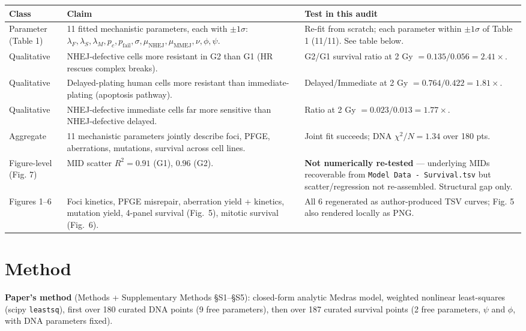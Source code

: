 \documentclass[11pt]{article}
\begin{document}
\begin{longtable}{p{3.5cm} p{6.5cm} p{5cm}}
\toprule
\textbf{Class} & \textbf{Claim} & \textbf{Test in this audit} \\
\midrule
\endhead
Parameter (Table 1) & 11 fitted mechanistic parameters, each with
$\pm 1\sigma$: $\lambda_F, \lambda_S, \lambda_M, p_c, p_{\text{fail}},
\sigma, \mu_{\text{NHEJ}}, \mu_{\text{MMEJ}}, \nu, \phi, \psi$. &
Re-fit from scratch; each parameter within $\pm 1\sigma$ of Table 1
(11/11). See table below. \\
Qualitative & NHEJ-defective cells more resistant in G2 than G1
(HR rescues complex breaks). &
G2/G1 survival ratio at 2 Gy $= 0.135 / 0.056 = 2.41\times$. \\
Qualitative & Delayed-plating human cells more resistant than
immediate-plating (apoptosis pathway). &
Delayed/Immediate at 2 Gy $= 0.764 / 0.422 = 1.81\times$. \\
Qualitative & NHEJ-defective immediate cells far more sensitive than
NHEJ-defective delayed. & Ratio at 2 Gy $= 0.023 / 0.013 = 1.77\times$. \\
Aggregate & 11 mechanistic parameters jointly describe foci, PFGE,
aberrations, mutations, survival across cell lines. &
Joint fit succeeds; DNA $\chi^2/N = 1.34$ over 180 pts. \\
Figure-level (Fig. 7) & MID scatter $R^2 = 0.91$ (G1), $0.96$ (G2). &
\textbf{Not numerically re-tested} --- underlying MIDs recoverable from
\texttt{Model Data - Survival.tsv} but scatter/regression not
re-assembled. Structural gap only. \\
Figures 1--6 & Foci kinetics, PFGE misrepair, aberration yield +
kinetics, mutation yield, 4-panel survival (Fig.\ 5), mitotic survival
(Fig.\ 6). & All 6 regenerated as author-produced TSV curves; Fig. 5
also rendered locally as PNG. \\
\bottomrule
\end{longtable}

\section{Method}

\textbf{Paper's method} (Methods + Supplementary Methods \S S1--\S S5):
closed-form analytic Medras model, weighted nonlinear least-squares
(scipy \texttt{leastsq}), first over 180 curated DNA points
(9 free parameters), then over 187 curated survival points (2 free
parameters, $\psi$ and $\phi$, with DNA parameters fixed).
\end{document}
